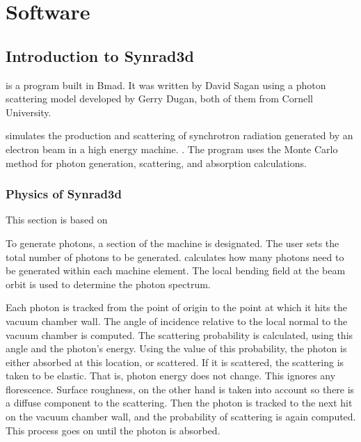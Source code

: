 
\chapter{Software} %

\label{soft} %





\section{Introduction to Synrad3d}
\label{Synrad3d}
\srthree is a program built in Bmad. It was written by David Sagan using a photon scattering model developed by Gerry Dugan, both of them from Cornell University. 
 
\srthree  simulates the production and scattering of synchrotron radiation generated by an electron beam in a high energy machine. \citep{syn}. The \srthree program uses the Monte Carlo method for photon generation, scattering, and absorption calculations.
\subsection{Physics of Synrad3d}


This section is based on \cite{syn} 

To generate photons, a section of the machine is designated.  The user sets the total number of photons to be generated. \srthree calculates how many photons need to be generated within each machine element. The local bending field at the beam orbit is used to determine the photon spectrum.

Each photon is tracked from the point of origin to the point at which it hits the vacuum chamber wall. The angle of incidence relative to the local normal to the vacuum chamber is computed. The scattering probability is calculated, using this angle and the photon's energy. Using the value of this probability, the photon is either absorbed at this location, or scattered. If it is scattered, the scattering is taken to be elastic. That is, photon energy does not change. This ignores any florescence. Surface roughness, on the other hand is taken into account so there is a diffuse component to the scattering. Then the photon is tracked to the next hit on the vacuum chamber wall, and the probability of scattering is again computed. This process goes on until the photon is absorbed.
